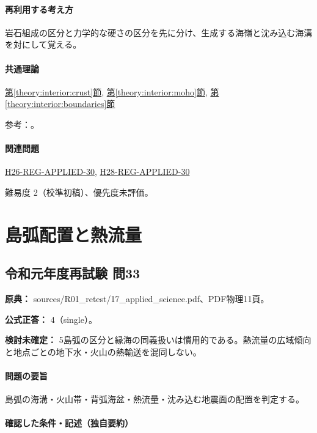 \paragraph{再利用する考え方} 岩石組成の区分と力学的な硬さの区分を先に分け、生成する海嶺と沈み込む海溝を対にして覚える。

\paragraph{共通理論} \hyperref[theory:interior:crust]{第\ref*{theory:interior:crust}節}, \hyperref[theory:interior:moho]{第\ref*{theory:interior:moho}節}, \hyperref[theory:interior:boundaries]{第\ref*{theory:interior:boundaries}節}

\par 参考：\cite{usgs_interior_structure,usgs_plate_boundaries,umich_crust_teaching}。

\paragraph{関連問題} \hyperref[q:h26-reg-applied-30]{H26-REG-APPLIED-30}, \hyperref[q:h28-reg-applied-30]{H28-REG-APPLIED-30}

\par 難易度 2（校準初稿）、優先度未評価。

\section{島弧配置と熱流量}

\subsection{令和元年度再試験 問33}
\label{q:r01-ret-applied-33}

\noindent\textbf{原典：} sources/R01\_retest/17\_applied\_science.pdf、PDF物理11頁。

\textbf{公式正答：} 4（single）。

\par\textbf{検討未確定：} 5島弧の区分と縁海の同義扱いは慣用的である。熱流量の広域傾向と地点ごとの地下水・火山の熱輸送を混同しない。

\paragraph{問題の要旨} 島弧の海溝・火山帯・背弧海盆・熱流量・沈み込む地震面の配置を判定する。

\paragraph{確認した条件・記述（独自要約）}\mbox{}\par

